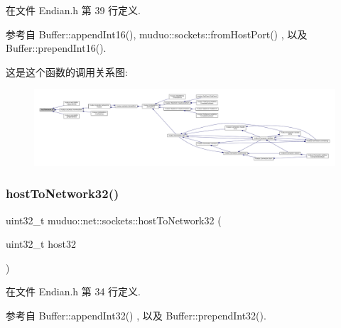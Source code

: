 在文件 Endian.\+h 第 39 行定义.



参考自 Buffer\+::append\+Int16(), muduo\+::sockets\+::from\+Host\+Port() , 以及 Buffer\+::prepend\+Int16().

这是这个函数的调用关系图\+:
\nopagebreak
\begin{figure}[H]
\begin{center}
\leavevmode
\includegraphics[width=350pt]{namespacemuduo_1_1net_1_1sockets_ae117e4d96b27b387f167e75fb17c1834_icgraph}
\end{center}
\end{figure}
\mbox{\label{namespacemuduo_1_1net_1_1sockets_a4bb4a759c0f63477b89bac777f863cef}} 
\subsubsection{\texorpdfstring{host\+To\+Network32()}{hostToNetwork32()}}
{\footnotesize\ttfamily uint32\+\_\+t muduo\+::net\+::sockets\+::host\+To\+Network32 (\begin{DoxyParamCaption}\item[{uint32\+\_\+t}]{host32 }\end{DoxyParamCaption})\hspace{0.3cm}{\ttfamily [inline]}}



在文件 Endian.\+h 第 34 行定义.



参考自 Buffer\+::append\+Int32() , 以及 Buffer\+::prepend\+Int32().

